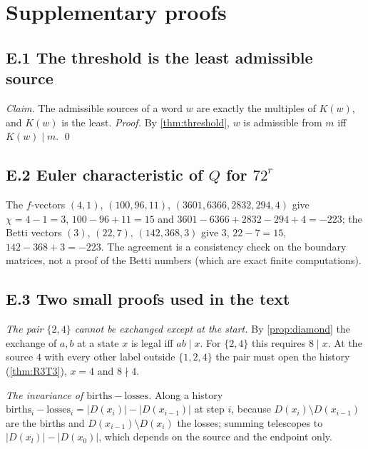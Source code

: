 \section{Supplementary proofs}\label{app:proofs}
\subsection*{E.1 The threshold is the least admissible source}
\emph{Claim.} The admissible sources of a word $w$ are exactly the multiples of $K(w)$, and $K(w)$ is the least. \emph{Proof.} By \cref{thm:threshold}, $w$ is admissible from $m$ iff $K(w)\mid m$. \qed
\subsection*{E.2 Euler characteristic of $Q$ for $72^r$}
The $f$-vectors $(4,1)$, $(100,96,11)$, $(3601,6366,2832,294,4)$ give $\chi=4-1=3$, $100-96+11=15$ and $3601-6366+2832-294+4=-223$; the Betti vectors $(3)$, $(22,7)$, $(142,368,3)$ give $3$, $22-7=15$, $142-368+3=-223$. The agreement is a consistency check on the boundary matrices, not a proof of the Betti numbers (which are exact finite computations).
\subsection*{E.3 Two small proofs used in the text}
\emph{The pair $\{2,4\}$ cannot be exchanged except at the start.} By \cref{prop:diamond} the exchange of $a,b$ at a state $x$ is legal iff $ab\mid x$. For $\{2,4\}$ this requires $8\mid x$. At the source $4$ with every other label outside $\{1,2,4\}$ the pair must open the history (\cref{thm:R3T3}), $x=4$ and $8\nmid4$.

\emph{The invariance of $\mathrm{births}-\mathrm{losses}$.} Along a history $\mathrm{births}_i-\mathrm{losses}_i=|D(x_i)|-|D(x_{i-1})|$ at step $i$, because $D(x_i)\setminus D(x_{i-1})$ are the births and $D(x_{i-1})\setminus D(x_i)$ the losses; summing telescopes to $|D(x_l)|-|D(x_0)|$, which depends on the source and the endpoint only.
